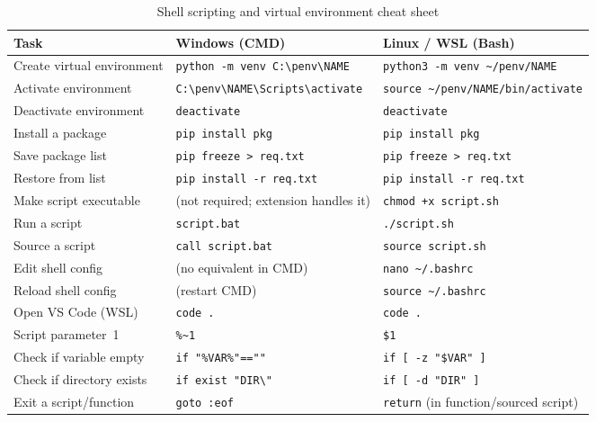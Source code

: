 \begin{table}[h]
\centering
\caption{Shell scripting and virtual environment cheat sheet}
\label{tab:cheatsheet}
\begin{tabular}{@{}p{}p{}p{}@{}}
\toprule
\textbf{Task} & \textbf{Windows (CMD)} & \textbf{Linux / WSL (Bash)} \\
\midrule
Create virtual environment
  & \texttt{python -m venv C:\textbackslash penv\textbackslash NAME}
  & \texttt{python3 -m venv \textasciitilde/penv/NAME} \\[4pt]
Activate environment
  & \texttt{C:\textbackslash penv\textbackslash NAME\textbackslash Scripts\textbackslash activate}
  & \texttt{source \textasciitilde/penv/NAME/bin/activate} \\[4pt]
Deactivate environment
  & \texttt{deactivate}
  & \texttt{deactivate} \\[4pt]
Install a package
  & \texttt{pip install pkg}
  & \texttt{pip install pkg} \\[4pt]
Save package list
  & \texttt{pip freeze > req.txt}
  & \texttt{pip freeze > req.txt} \\[4pt]
Restore from list
  & \texttt{pip install -r req.txt}
  & \texttt{pip install -r req.txt} \\[4pt]
Make script executable
  & (not required; extension handles it)
  & \texttt{chmod +x script.sh} \\[4pt]
Run a script
  & \texttt{script.bat}
  & \texttt{./script.sh} \\[4pt]
Source a script
  & \texttt{call script.bat}
  & \texttt{source script.sh} \\[4pt]
Edit shell config
  & (no equivalent in CMD)
  & \texttt{nano \textasciitilde/.bashrc} \\[4pt]
Reload shell config
  & (restart CMD)
  & \texttt{source \textasciitilde/.bashrc} \\[4pt]
Open VS Code (WSL)
  & \texttt{code .}
  & \texttt{code .} \\[4pt]
Script parameter~1
  & \texttt{\%\textasciitilde1}
  & \texttt{\$1} \\[4pt]
Check if variable empty
  & \texttt{if "\%VAR\%"==""}
  & \texttt{if [ -z "\$VAR" ]} \\[4pt]
Check if directory exists
  & \texttt{if exist "DIR\textbackslash"}
  & \texttt{if [ -d "DIR" ]} \\[4pt]
Exit a script/function
  & \texttt{goto :eof}
  & \texttt{return} (in function/sourced script) \\
\bottomrule
\end{tabular}
\end{table}


